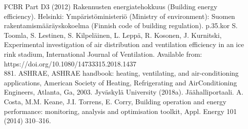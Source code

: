 \documentclass[hyperref]{ctexart}
\begin{document}
\begin{multicols}{2}
\begin{thebibliography}{100}
			 FCBR Part D3 (2012) Rakennusten energiatehokkuus (Building energy efficiency). Helsinki: Ympäristöministeriö (Ministry of environment): Suomen rakentamismääräyskokoelma (Finnish code of building regulation). p.35.kor 
			 S. Toomla, S. Lestinen, S. Kilpeläinen, L. Leppä, R. Kosonen, J. Kurnitski, Experimental investigation of air distribution and ventilation efficiency in an ice rink stadium, International Journal of Ventilation. Available from: https://doi.org/10.1080/14733315.2018.1437\\881. 
			 ASHRAE, ASHRAE handbook: heating, ventilating, and air-conditioning applications, American Society of Heating, Refrigerating and AirConditioning Engineers, Atlanta, Ga, 2003. 
			 Jyväskylä University (2018a). Jäähalliportaali. 
			 A. Costa, M.M. Keane, J.I. Torrens, E. Corry, Building operation and energy performance: monitoring, analysis and optimisation toolkit, Appl. Energy 101 (2014) 310–316.
		\end{thebibliography}
	\end{multicols}
\end{document}
